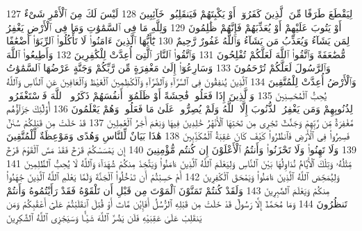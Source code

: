 {\tiny\colorbox{cl_aya}{127}} لِيَقْطَعَ طَرَفًا مِّنَ ٱلَّذِينَ كَفَرُوٓا۟ أَوْ يَكْبِتَهُمْ فَيَنقَلِبُوا۟ خَآئِبِينَ
{\tiny\colorbox{cl_aya}{128}} لَيْسَ لَكَ مِنَ ٱلْأَمْرِ شَىْءٌ أَوْ يَتُوبَ عَلَيْهِمْ أَوْ يُعَذِّبَهُمْ فَإِنَّهُمْ ظَٰلِمُونَ
{\tiny\colorbox{cl_aya}{129}} وَلِلَّهِ مَا فِى ٱلسَّمَٰوَٰتِ وَمَا فِى ٱلْأَرْضِ يَغْفِرُ لِمَن يَشَآءُ وَيُعَذِّبُ مَن يَشَآءُ وَٱللَّهُ غَفُورٌ رَّحِيمٌ
{\tiny\colorbox{cl_aya}{130}} يَٰٓأَيُّهَا ٱلَّذِينَ ءَامَنُوا۟ لَا تَأْكُلُوا۟ ٱلرِّبَوٰٓا۟ أَضْعَٰفًا مُّضَٰعَفَةً وَٱتَّقُوا۟ ٱللَّهَ لَعَلَّكُمْ تُفْلِحُونَ
{\tiny\colorbox{cl_aya}{131}} وَٱتَّقُوا۟ ٱلنَّارَ ٱلَّتِىٓ أُعِدَّتْ لِلْكَٰفِرِينَ
{\tiny\colorbox{cl_aya}{132}} وَأَطِيعُوا۟ ٱللَّهَ وَٱلرَّسُولَ لَعَلَّكُمْ تُرْحَمُونَ
{\tiny\colorbox{cl_aya}{133}} وَسَارِعُوٓا۟ إِلَىٰ مَغْفِرَةٍ مِّن رَّبِّكُمْ وَجَنَّةٍ عَرْضُهَا ٱلسَّمَٰوَٰتُ وَٱلْأَرْضُ أُعِدَّتْ لِلْمُتَّقِينَ
{\tiny\colorbox{cl_aya}{134}} ٱلَّذِينَ يُنفِقُونَ فِى ٱلسَّرَّآءِ وَٱلضَّرَّآءِ وَٱلْكَٰظِمِينَ ٱلْغَيْظَ وَٱلْعَافِينَ عَنِ ٱلنَّاسِ وَٱللَّهُ يُحِبُّ ٱلْمُحْسِنِينَ
{\tiny\colorbox{cl_aya}{135}} وَٱلَّذِينَ إِذَا فَعَلُوا۟ فَٰحِشَةً أَوْ ظَلَمُوٓا۟ أَنفُسَهُمْ ذَكَرُوا۟ ٱللَّهَ فَٱسْتَغْفَرُوا۟ لِذُنُوبِهِمْ وَمَن يَغْفِرُ ٱلذُّنُوبَ إِلَّا ٱللَّهُ وَلَمْ يُصِرُّوا۟ عَلَىٰ مَا فَعَلُوا۟ وَهُمْ يَعْلَمُونَ
{\tiny\colorbox{cl_aya}{136}} أُو۟لَٰٓئِكَ جَزَآؤُهُم مَّغْفِرَةٌ مِّن رَّبِّهِمْ وَجَنَّٰتٌ تَجْرِى مِن تَحْتِهَا ٱلْأَنْهَٰرُ خَٰلِدِينَ فِيهَا وَنِعْمَ أَجْرُ ٱلْعَٰمِلِينَ
{\tiny\colorbox{cl_aya}{137}} قَدْ خَلَتْ مِن قَبْلِكُمْ سُنَنٌ فَسِيرُوا۟ فِى ٱلْأَرْضِ فَٱنظُرُوا۟ كَيْفَ كَانَ عَٰقِبَةُ ٱلْمُكَذِّبِينَ
{\tiny\colorbox{cl_aya}{138}} هَٰذَا بَيَانٌ لِّلنَّاسِ وَهُدًى وَمَوْعِظَةٌ لِّلْمُتَّقِينَ
{\tiny\colorbox{cl_aya}{139}} وَلَا تَهِنُوا۟ وَلَا تَحْزَنُوا۟ وَأَنتُمُ ٱلْأَعْلَوْنَ إِن كُنتُم مُّؤْمِنِينَ
{\tiny\colorbox{cl_aya}{140}} إِن يَمْسَسْكُمْ قَرْحٌ فَقَدْ مَسَّ ٱلْقَوْمَ قَرْحٌ مِّثْلُهُۥ وَتِلْكَ ٱلْأَيَّامُ نُدَاوِلُهَا بَيْنَ ٱلنَّاسِ وَلِيَعْلَمَ ٱللَّهُ ٱلَّذِينَ ءَامَنُوا۟ وَيَتَّخِذَ مِنكُمْ شُهَدَآءَ وَٱللَّهُ لَا يُحِبُّ ٱلظَّٰلِمِينَ
{\tiny\colorbox{cl_aya}{141}} وَلِيُمَحِّصَ ٱللَّهُ ٱلَّذِينَ ءَامَنُوا۟ وَيَمْحَقَ ٱلْكَٰفِرِينَ
{\tiny\colorbox{cl_aya}{142}} أَمْ حَسِبْتُمْ أَن تَدْخُلُوا۟ ٱلْجَنَّةَ وَلَمَّا يَعْلَمِ ٱللَّهُ ٱلَّذِينَ جَٰهَدُوا۟ مِنكُمْ وَيَعْلَمَ ٱلصَّٰبِرِينَ
{\tiny\colorbox{cl_aya}{143}} وَلَقَدْ كُنتُمْ تَمَنَّوْنَ ٱلْمَوْتَ مِن قَبْلِ أَن تَلْقَوْهُ فَقَدْ رَأَيْتُمُوهُ وَأَنتُمْ تَنظُرُونَ
{\tiny\colorbox{cl_aya}{144}} وَمَا مُحَمَّدٌ إِلَّا رَسُولٌ قَدْ خَلَتْ مِن قَبْلِهِ ٱلرُّسُلُ أَفَإِي۟ن مَّاتَ أَوْ قُتِلَ ٱنقَلَبْتُمْ عَلَىٰٓ أَعْقَٰبِكُمْ وَمَن يَنقَلِبْ عَلَىٰ عَقِبَيْهِ فَلَن يَضُرَّ ٱللَّهَ شَيْـًٔا وَسَيَجْزِى ٱللَّهُ ٱلشَّٰكِرِينَ
